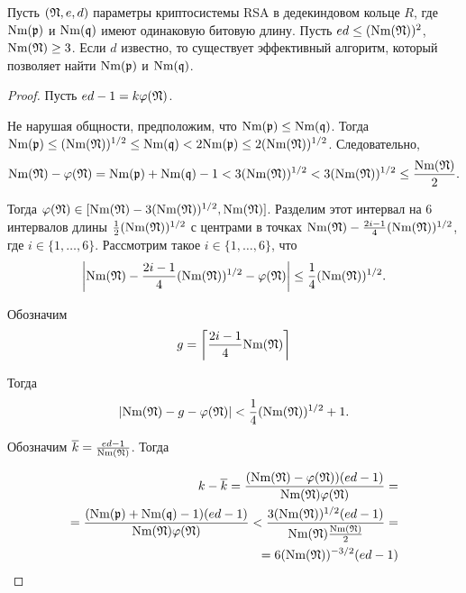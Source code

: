 \documentclass[_00_dissertation.tex]{subfiles}
\begin{document}
\begin{theorem}\label{theorem:d_is_known_2}
    Пусть $(\mathfrak{N}, e, d)$ параметры криптосистемы RSA в дедекиндовом кольце $R$, где $\textrm{Nm}(\mathfrak{p})$ и $\textrm{Nm}(\mathfrak{q})$ имеют одинаковую битовую длину.
    Пусть $e d \le (\textrm{Nm}(\mathfrak{N}))^2$, $\textrm{Nm}(\mathfrak{N}) \ge 3$.
    Если $d$ известно, то существует эффективный алгоритм, который позволяет найти $\textrm{Nm}(\mathfrak{p})$ и $\textrm{Nm}(\mathfrak{q})$.
\end{theorem}
\begin{proof}
    Пусть $e d - 1 = k\varphi(\mathfrak{N})$.

    Не нарушая общности, предположим, что $\textrm{Nm}(\mathfrak{p}) \le \textrm{Nm}(\mathfrak{q})$.
    Тогда $\textrm{Nm}(\mathfrak{p}) \le (\textrm{Nm}(\mathfrak{N}))^{1/2} \le \textrm{Nm}(\mathfrak{q}) < 2\textrm{Nm}(\mathfrak{p}) \le 2(\textrm{Nm}(\mathfrak{N}))^{1/2}$.
    Следовательно,
    \begin{equation*}
        \textrm{Nm}(\mathfrak{N}) - \varphi(\mathfrak{N}) = \textrm{Nm}(\mathfrak{p}) + \textrm{Nm}(\mathfrak{q}) - 1 < 3(\textrm{Nm}(\mathfrak{N}))^{1/2} < 3(\textrm{Nm}(\mathfrak{N}))^{1/2} \le \frac{\textrm{Nm}(\mathfrak{N})}{2}.
    \end{equation*}

    Тогда $\varphi(\mathfrak{N}) \in [\textrm{Nm}(\mathfrak{N})-3(\textrm{Nm}(\mathfrak{N}))^{1/2}, \textrm{Nm}(\mathfrak{N})]$.
    Разделим этот интервал на $6$ интервалов длины $\frac{1}{2}(\textrm{Nm}(\mathfrak{N}))^{1/2}$ с центрами в точках $\textrm{Nm}(\mathfrak{N}) - \frac{2i-1}{4}(\textrm{Nm}(\mathfrak{N}))^{1/2}$, где $i \in \{1, \ldots, 6\}$.
    Рассмотрим такое $i \in \{1, \ldots, 6\}$, что
    \begin{equation*}
        \left|
            \textrm{Nm}(\mathfrak{N})-\frac{2i-1}{4}(\textrm{Nm}(\mathfrak{N}))^{1/2}-\varphi(\mathfrak{N})
        \right| \le \frac{1}{4}(\textrm{Nm}(\mathfrak{N}))^{1/2}.
    \end{equation*}
  
    Обозначим
    \begin{equation*}
        g = \left\lceil
            \frac{2i-1}{4}\textrm{Nm}(\mathfrak{N})
        \right\rceil
    \end{equation*}

    Тогда
    \begin{equation*}
        \left|
            \textrm{Nm}(\mathfrak{N}) - g - \varphi(\mathfrak{N})
        \right| < \frac{1}{4}(\textrm{Nm}(\mathfrak{N}))^{1/2} + 1.
    \end{equation*}

    Обозначим $\overline{k} = \frac{ed-1}{\textrm{Nm}(\mathfrak{N})}$.
    Тогда

    \begin{equation*}
        \begin{split}
            k - \overline{k} =
            \frac{(\textrm{Nm}(\mathfrak{N})-\varphi(\mathfrak{N}))(ed-1)}{\textrm{Nm}(\mathfrak{N})\varphi(\mathfrak{N})} =\\
            = \frac{(\textrm{Nm}(\mathfrak{p})+\textrm{Nm}(\mathfrak{q})-1)(ed-1)}{\textrm{Nm}(\mathfrak{N})\varphi(\mathfrak{N})} < \frac{3(\textrm{Nm}(\mathfrak{N}))^{1/2}(ed-1)}{\textrm{Nm}(\mathfrak{N})\frac{\textrm{Nm}(\mathfrak{N})}{2}} =\\
            = 6(\textrm{Nm}(\mathfrak{N}))^{-3/2}(ed-1)
        \end{split}
    \end{equation*}
  

\end{proof}
\end{document}
